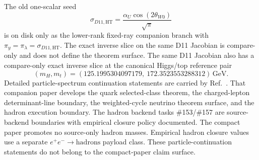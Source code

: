 \documentclass[11pt]{article}
\begin{document}
The old one-scalar seed
\[
\sigma_{D11,\mathrm{HT}}=\frac{\alpha_U\cos(2\theta_{W0})}{\sqrt{\pi}}
\]
is on disk only as the lower-rank fixed-ray companion branch with \(\pi_y=\pi_\lambda=\sigma_{D11,\mathrm{HT}}\). The exact inverse slice on the same D11 Jacobian is compare-only and does not define the theorem surface.
The same D11 Jacobian also has a compare-only exact inverse slice at the canonical Higgs/top reference pair
\[
(m_H,m_t)=
(125.1995304097179,\ 172.3523553288312)\,\mathrm{GeV}.
\]
Detailed particle-spectrum continuation statements are carried by Ref.~\cite{ophparticles}. That companion paper develops the quark selected-class theorem, the charged-lepton determinant-line boundary, the weighted-cycle neutrino theorem surface, and the hadron execution boundary. The hadron backend tasks \#153/\#157 are source-backend boundaries with empirical closure policy documented. The compact paper promotes no source-only hadron masses. Empirical hadron closure values use a separate \(e^+e^-\to\mathrm{hadrons}\) payload class. These particle-continuation statements do not belong to the compact-paper claim surface.
\end{document}
